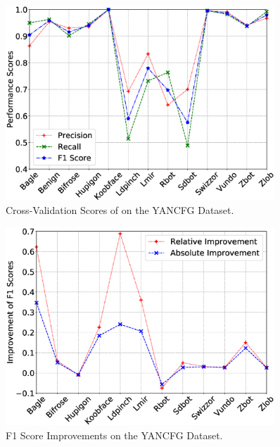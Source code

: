 \begin{figure}
    \centerline{\includegraphics[width=0.90\textwidth]{Magic/figures/YanAcfgScores.eps}}
    \caption{Cross-Validation Scores of \sysname on the YANCFG Dataset.}
    \label{MG:Fig:YANCFGScores}
\end{figure}

\begin{figure}
    \centerline{\includegraphics[width=0.90\textwidth]{Magic/figures/YanAcfgF1Improve.eps}}
    \caption{F1 Score Improvements on the YANCFG Dataset.}
    \label{MG:Fig:YANCFGF1Improve}
\end{figure}

